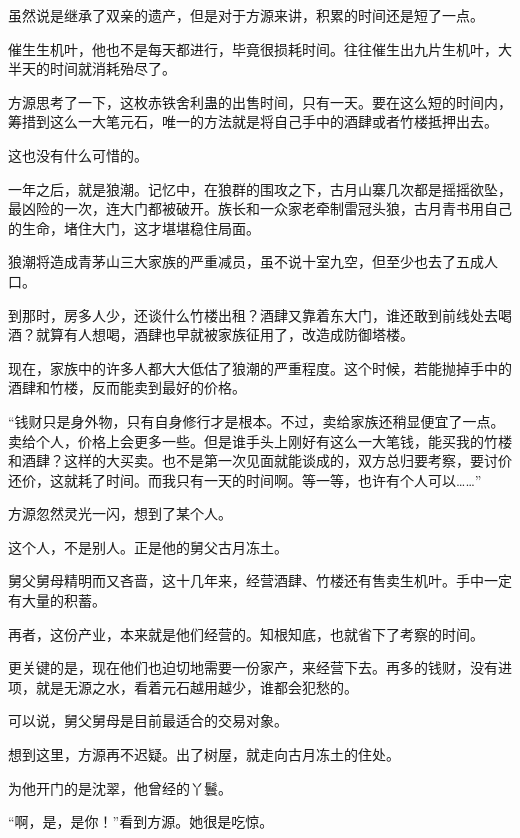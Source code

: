
\begin{this_body}



虽然说是继承了双亲的遗产，但是对于方源来讲，积累的时间还是短了一点。

催生生机叶，他也不是每天都进行，毕竟很损耗时间。往往催生出九片生机叶，大半天的时间就消耗殆尽了。

方源思考了一下，这枚赤铁舍利蛊的出售时间，只有一天。要在这么短的时间内，筹措到这么一大笔元石，唯一的方法就是将自己手中的酒肆或者竹楼抵押出去。

这也没有什么可惜的。

一年之后，就是狼潮。记忆中，在狼群的围攻之下，古月山寨几次都是摇摇欲坠，最凶险的一次，连大门都被破开。族长和一众家老牵制雷冠头狼，古月青书用自己的生命，堵住大门，这才堪堪稳住局面。

狼潮将造成青茅山三大家族的严重减员，虽不说十室九空，但至少也去了五成人口。

到那时，房多人少，还谈什么竹楼出租？酒肆又靠着东大门，谁还敢到前线处去喝酒？就算有人想喝，酒肆也早就被家族征用了，改造成防御塔楼。

现在，家族中的许多人都大大低估了狼潮的严重程度。这个时候，若能抛掉手中的酒肆和竹楼，反而能卖到最好的价格。

“钱财只是身外物，只有自身修行才是根本。不过，卖给家族还稍显便宜了一点。卖给个人，价格上会更多一些。但是谁手头上刚好有这么一大笔钱，能买我的竹楼和酒肆？这样的大买卖。也不是第一次见面就能谈成的，双方总归要考察，要讨价还价，这就耗了时间。而我只有一天的时间啊。等一等，也许有个人可以……”

方源忽然灵光一闪，想到了某个人。

这个人，不是别人。正是他的舅父古月冻土。

舅父舅母精明而又吝啬，这十几年来，经营酒肆、竹楼还有售卖生机叶。手中一定有大量的积蓄。

再者，这份产业，本来就是他们经营的。知根知底，也就省下了考察的时间。

更关键的是，现在他们也迫切地需要一份家产，来经营下去。再多的钱财，没有进项，就是无源之水，看着元石越用越少，谁都会犯愁的。

可以说，舅父舅母是目前最适合的交易对象。

想到这里，方源再不迟疑。出了树屋，就走向古月冻土的住处。

为他开门的是沈翠，他曾经的丫鬟。

“啊，是，是你！”看到方源。她很是吃惊。


\end{this_body}
